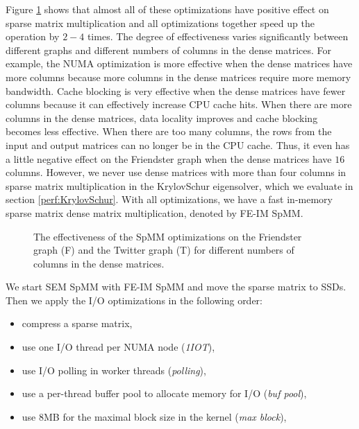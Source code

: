 Figure \ref{perf:spmm_opt} shows that almost all of these optimizations have
positive effect on sparse matrix multiplication and all optimizations
together speed up the operation by $2-4$ times.
The degree of effectiveness varies
significantly between different graphs and different numbers of columns in
the dense matrices. For example, the NUMA optimization is more effective when
the dense matrices have more columns because more columns in the dense matrices
require more memory bandwidth. Cache blocking is very effective when
the dense matrices have fewer columns because it can effectively increase CPU
cache hits. When there are more columns in the dense matrices, data locality
improves and cache blocking becomes less effective. When there are too many
columns, the rows from
the input and output matrices can no longer be in the CPU cache. Thus, it even
has a little negative effect on the Friendster graph when the dense matrices
have $16$ columns. However, we never use dense matrices with more than four
columns in sparse matrix multiplication in the KrylovSchur eigensolver, which
we evaluate in section \ref{perf:KrylovSchur}. With all optimizations, we
have a fast in-memory sparse matrix dense matrix multiplication, denoted by
FE-IM SpMM.


\begin{figure}
	\begin{center}
		\footnotesize
		\vspace{-15pt}
		
		\vspace{-15pt}
		\caption{The effectiveness of the SpMM optimizations on the Friendster
			graph (F) and the Twitter graph (T) for different numbers of
			columns in the dense matrices.}
		\label{perf:spmm_opt}
	\end{center}
\end{figure}

We start SEM SpMM with FE-IM SpMM and move the sparse matrix to SSDs. Then we
apply the I/O optimizations in the following order:
\begin{itemize} \itemsep1pt \parskip0pt 
	\item compress a sparse matrix,
	\item use one I/O thread per NUMA node (\textit{1IOT}),
	\item use I/O polling in worker threads (\textit{polling}),
	\item use a per-thread buffer pool to allocate memory for I/O
		(\textit{buf pool}),
	\item use 8MB for the maximal block size in the kernel (\textit{max block}),
\end{itemize}

